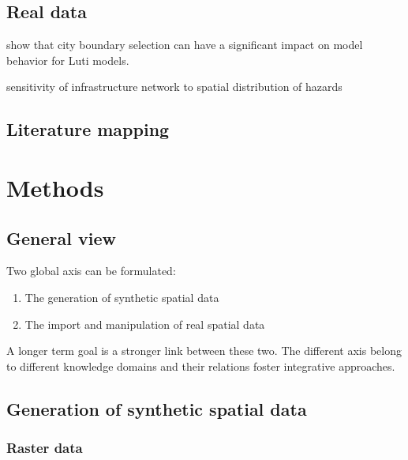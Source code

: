 \subsection{Real data}

\cite{Thomasetal2017} show that city boundary selection can have a significant impact on model behavior for Luti models.

\cite{moderl2011spatial} sensitivity of infrastructure network to spatial distribution of hazards






\subsection{Literature mapping}

%





\section{Methods}


\subsection{General view}

Two global axis can be formulated:

\begin{enumerate}
	\item The generation of synthetic spatial data
	\item The import and manipulation of real spatial data 
\end{enumerate}

A longer term goal is a stronger link between these two. The different axis belong to different knowledge domains \cite{raimbault2017applied} and their relations foster integrative approaches.



\subsection{Generation of synthetic spatial data}


\subsubsection{Raster data}

